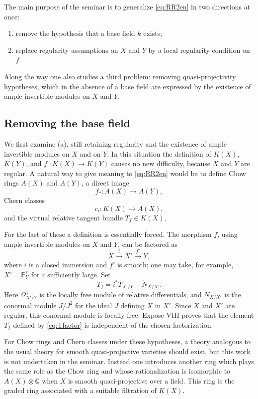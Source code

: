 \documentclass[11pt]{article}
\theoremstyle{plain}
\theoremstyle{definition}
\theoremstyle{remark}
\newcommand{\PP}{\mathbb P}
\newcommand{\QQ}{\mathbb Q}
\begin{document}
The main purpose of the seminar is to generalize \eqref{eq:RR2en} in two directions at once:
\begin{enumerate}[label=(\alph*)]
\item remove the hypothesis that a base field $k$ exists;
\item replace regularity assumptions on $X$ and $Y$ by a local regularity condition on $f$.
\end{enumerate}
Along the way one also studies a third problem: removing quasi-projectivity hypotheses, which in the absence of a base field are expressed by the existence of ample invertible modules on $X$ and $Y$.

\subsection{Removing the base field}

We first examine (a), still retaining regularity and the existence of ample invertible modules on $X$ and on $Y$. In this situation the definition of $K(X)$, $K(Y)$, and $f_!:K(X)\to K(Y)$ causes no new difficulty, because $X$ and $Y$ are regular. A natural way to give meaning to \eqref{eq:RR2en} would be to define Chow rings $A(X)$ and $A(Y)$, a direct image
\[
   f_*:A(X)\to A(Y),
\]
Chern classes
\[
   c_i:K(X)\to A(X),
\]
and the virtual relative tangent bundle $T_f\in K(X)$.

For the last of these a definition is essentially forced. The morphism $f$, using ample invertible modules on $X$ and $Y$, can be factored as
\begin{equation}\label{eq:factor}
   X\xrightarrow{i}X'\xrightarrow{f'}Y,
\end{equation}
where $i$ is a closed immersion and $f'$ is smooth; one may take, for example, $X'=\PP^r_Y$ for $r$ sufficiently large. Set
\begin{equation}\label{eq:Tfactor}
   T_f=i^*T_{X'/Y}-\check N_{X/X'}.
\end{equation}
Here $\Omega^1_{X'/Y}$ is the locally free module of relative differentials, and $N_{X/X'}$ is the conormal module $J/J^2$ for the ideal $J$ defining $X$ in $X'$. Since $X$ and $X'$ are regular, this conormal module is locally free. Expose VIII proves that the element $T_f$ defined by \eqref{eq:Tfactor} is independent of the chosen factorization.

For Chow rings and Chern classes under these hypotheses, a theory analogous to the usual theory for smooth quasi-projective varieties should exist, but this work is not undertaken in the seminar. Instead one introduces another ring which plays the same role as the Chow ring and whose rationalization is isomorphic to $A(X)\otimes\QQ$ when $X$ is smooth quasi-projective over a field. This ring is the graded ring associated with a suitable filtration of $K(X)$.
\end{document}
